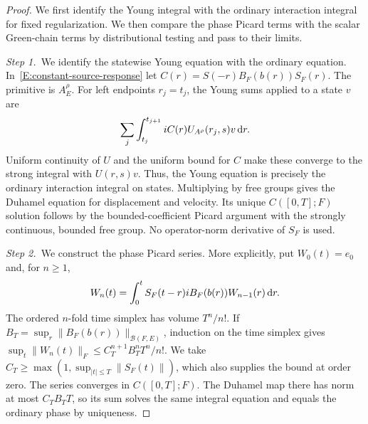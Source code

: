 \begin{proof}
  We first identify the Young integral with the ordinary interaction integral
  for fixed regularization. We then compare the phase Picard terms with the
  scalar Green-chain terms by distributional testing and pass to their limits.

  \medskip
  \noindent\textit{Step 1.~}We identify the statewise Young equation with the
  ordinary equation.
  In~\eqref{E:constant-source-response} let $C(r) = S(-r)B_F(b(r))S_F(r)$. The
  primitive is $A_E^\rho$. For left endpoints $r_j = t_j$, the Young sums
  applied to a state $v$ are
  \[
    \sum_j\int_{t_j}^{t_{j+1}}iC(r)U_{A^\rho}(r_j,s)v\,\mathrm{d} r.
  \]
  Uniform continuity of $U$ and the uniform bound for $C$ make these converge to
  the strong integral with $U(r,s)v$. Thus, the Young equation is precisely the
  ordinary interaction integral on states. Multiplying by free groups gives the
  Duhamel equation for displacement and velocity. Its unique $C([0,T];F)$
  solution follows by the bounded-coefficient Picard argument with the strongly
  continuous, bounded free group. No operator-norm derivative of $S_F$ is used.

  \medskip
  \noindent\textit{Step 2.~}We construct the phase Picard series.
  More explicitly, put $W_0(t) = e_0$ and, for $n \ge 1$,
  \[
    W_n(t)=\int_0^t S_F(t-r)iB_F(b(r))W_{n-1}(r)\,\mathrm{d} r.
  \]
  The ordered $n$-fold time simplex has volume $T^n/n!$.
  If $B_T = \sup_r\|B_F(b(r))\|_{\mathcal{B}(F,E)}$, induction on the time
  simplex gives $\sup_t\|W_n(t)\|_F \le C_T^{n+1}B_T^nT^n/n!$. We take $C_T \ge
  \max(1,\sup_{|t|\le T}\|S_F(t)\|)$, which also supplies the bound at order
  zero. The series converges in $C([0,T];F)$. The Duhamel map there has norm at
  most $C_TB_TT$, so its sum solves the same integral equation and equals the
  ordinary phase by uniqueness.



\end{proof}
